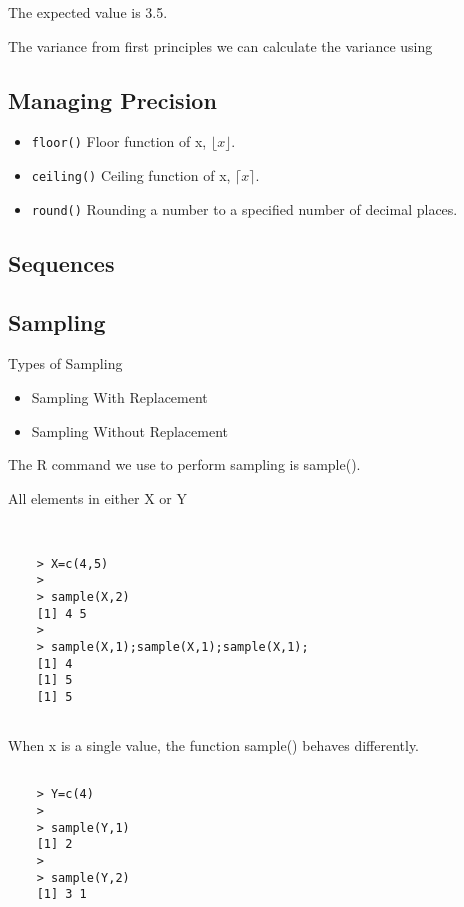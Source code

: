 \documentclass[a4paper,12pt]{article}
\begin{document}
The expected value is 3.5.

The variance from first principles we can calculate the variance using

\subsection{Managing Precision}

\begin{itemize}
	\item \texttt{floor()} Floor function of x, $\lfloor x \rfloor$.
	\item \texttt{ceiling()} Ceiling function of x, $\lceil x \rceil$.
	\item \texttt{round()} Rounding a number to a specified number of decimal places.
\end{itemize}

\subsection{Sequences}


\subsection{Sampling}

Types of Sampling
\begin{itemize}
	\item Sampling With Replacement
	\item Sampling Without Replacement
\end{itemize}

The R command we use to perform sampling is sample().

All elements in either X or Y

\begin{framed}
	\begin{verbatim}
	
	
	> X=c(4,5)
	>
	> sample(X,2)
	[1] 4 5
	>
	> sample(X,1);sample(X,1);sample(X,1);
	[1] 4
	[1] 5
	[1] 5
	
	\end{verbatim}
\end{framed}
When x is a single value, the function sample() behaves differently.

\begin{framed}
	\begin{verbatim}
	
	> Y=c(4)
	>
	> sample(Y,1)
	[1] 2
	> 
	> sample(Y,2)
	[1] 3 1
	\end{verbatim}
\end{framed}
\end{document}
